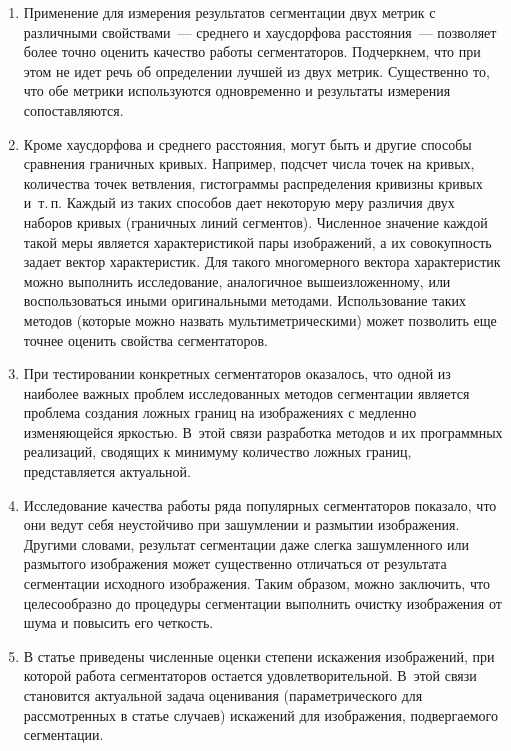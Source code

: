 \begin{multicols}{2}
  \noindent
  \begin{enumerate}[1.]
  \item Применение для измерения результатов сегментации двух метрик с 
различными свойствами~--- среднего и хаусдорфова расстояния~--- позволяет 
более точно оценить качество\linebreak
работы сегментаторов. Подчеркнем, что при этом 
не идет речь об определении лучшей из двух метрик. Существенно то, что обе 
метрики используются одновременно и результаты измерения сопоставляются.
  \item  Кроме хаусдорфова и среднего расстояния, могут быть и другие 
способы сравнения граничных кривых. Например, подсчет числа точек на 
кривых, количества точек ветвления, гистограммы распределения кривизны 
кривых и~т.\,п. Каждый из таких способов дает некоторую меру различия двух 
наборов кривых (граничных линий сегментов). Численное значение каждой 
такой меры является характеристикой пары изображений, а их совокупность 
задает вектор характеристик. Для такого многомерного вектора характеристик 
можно выполнить исследование, аналогичное вышеизложенному, или 
воспользоваться иными оригинальными методами. Использование таких 
методов (которые можно назвать мультиметрическими) может позволить еще 
точнее оценить свойства сегментаторов.
  \item  При тестировании конкретных сегментаторов оказалось, что одной из 
наиболее важных проблем исследованных методов сегментации является 
проблема создания ложных границ на изображениях с медленно изменяющейся 
яркостью. В~этой связи разработка методов и их программных реализаций, 
сводящих к минимуму количество ложных границ, представляется актуальной.
  \item  Исследование качества работы ряда популярных сегментаторов 
показало, что они ведут себя неустойчиво при зашумлении и размытии 
изоб\-ра\-же\-ния. Другими словами, результат сегментации даже слегка 
зашумленного или размытого изображения может существенно отличаться от 
результата сегментации исходного изображения. Таким образом, можно 
заключить, что целесообразно до процедуры сегментации выполнить очистку 
изображения от шума и повысить его четкость.
  \item  В статье приведены численные оценки степени искажения 
изображений, при которой работа сегментаторов остается удовлетворительной. 
В~этой связи становится актуальной\linebreak
задача оценивания (параметрического для 
рассмотренных в статье случаев) искажений для изображения, подвергаемого 
сегментации.
  \end{enumerate}
  


\end{multicols}

